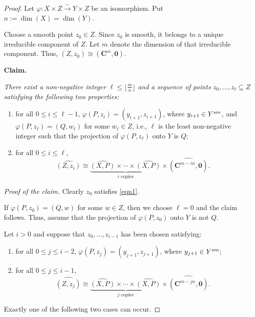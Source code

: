\documentclass[10pt,a4paper]{amsart}
\numberwithin{equation}{section}
\numberwithin{figure}{section}
\numberwithin{equation}{section}
\newcommand{\C}{\mathbf{C}}
\newcommand{\oo}{\mathbf{0}}
\begin{document}
\begin{proof}
Let $\varphi:X\times Z \xrightarrow{\sim} Y\times Z$ be an isomorphism. Put $n:=\dim(X)=\dim(Y)$.

Choose a smooth point $z_0\in Z$. Since $z_0$ is smooth, it belongs to a unique irreducible component of $Z$. Let $m$ denote the dimension of that irreducible component. Thus, $(Z,z_0)\cong (\C^m,\oo)$.

\medskip
\textbf{Claim.} {\it There exist a non-negative integer $\ell \leq \lfloor \frac{m}{n}\rfloor$ and a sequence of points ${z_0,\ldots,z_\ell}\subseteq Z$ satisfying the following two properties:
\begin{enumerate}[\indent\rm(1)]
\item for all $0\leq i\leq \ell-1$, $\varphi(P,z_i)=(y_{i+1},z_{i+1})$, where $y_{i+1}\in Y^{\rm sm}$, and $\varphi(P,z_\ell)=(Q,w_\ell)$ for some $w_\ell\in Z$, i.e., $\ell$ is the least non-negative integer such that the projection of $\varphi(P,z_\ell)$ onto $Y$ is $Q$;

\item for all $0\leq i\leq \ell$,
\begin{equation}\label{eqn1}
\widehat{(Z,z_i)}
\cong
\underbrace{\widehat{(X,P)}\times \cdots \times \widehat{(X,P)}}_{i\text{ copies}}
\times
\widehat{(\C^{m-in},\oo)}.
\end{equation}
\end{enumerate}
}

\smallskip

\textit{Proof of the claim.}
Clearly $z_0$ satisfies \eqref{eqn1}.

If $\varphi(P,z_0)=(Q,w)$ for some $w\in Z$, then we choose $\ell=0$ and the claim follows. Thus, assume that the projection of $\varphi(P,z_0)$ onto $Y$ is not $Q$.

Let $i>0$ and suppose that ${z_0,\ldots,z_{i-1}}$ has been chosen satisfying:

\begin{enumerate}[\indent\rm(1)]
\item for all $0\leq j\leq i-2$, $\varphi(P,z_j)=(y_{j+1},z_{j+1})$, where $y_{j+1}\in Y^{\rm sm}$;

\item for all $0\leq j\leq i-1$,
\[
\widehat{(Z,z_j)}
\cong
\underbrace{\widehat{(X,P)}\times \cdots \times \widehat{(X,P)}}_{j\text{ copies}}
\times
\widehat{(\C^{m-jn},\oo)}.
\]
\end{enumerate}

Exactly one of the following two cases can occur.


\end{proof}
\end{document}

